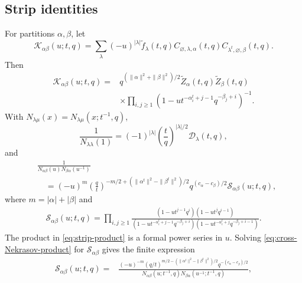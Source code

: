 \documentclass{amsart}
\theoremstyle{definition}
\numberwithin{equation}{section}
\begin{document}
\subsection{Strip identities}
For partitions \(\alpha,\beta\), let
\begin{equation}
 \mathcal K_{\alpha\beta}(u;t,q)
 =\sum_\lambda(-u)^{|\lambda|}\widetilde f_\lambda(t,q)
 C_{\varnothing,\lambda,\alpha}(t,q)
 C_{\lambda^t,\varnothing,\beta}(t,q).
\label{eq:strip-contraction}
\end{equation}
Then
\begin{equation}
\begin{aligned}
 \mathcal K_{\alpha\beta}(u;t,q)
 ={}&q^{(\|\alpha\|^2+\|\beta\|^2)/2}
 \widetilde Z_\alpha(t,q)\widetilde Z_\beta(t,q)\\
 &\times\prod_{i,j\geq1}
 \left(1-u t^{-\alpha_i^t+j-1}q^{-\beta_j+i}\right)^{-1}.
\end{aligned}
\label{eq:strip-product}
\end{equation}
With \(N_{\lambda\mu}(x)=N_{\lambda\mu}(x;t^{-1},q)\),
\begin{equation}
 \frac1{N_{\lambda\lambda}(1)}
 =(-1)^{|\lambda|}\left(\frac tq\right)^{|\lambda|/2}
  \mathscr D_\lambda(t,q),
\label{eq:self-Nekrasov-product}
\end{equation}
and
\begin{equation}
\begin{aligned}
 &\frac1{N_{\alpha\beta}(u)N_{\beta\alpha}(u^{-1})}\\
 &\quad={}
 (-u)^m
 \left(\frac qt\right)^{-m/2+
 (\|\alpha^t\|^2-\|\beta^t\|^2)/2}
 q^{(c_\alpha-c_\beta)/2}
 \mathcal S_{\alpha\beta}(u;t,q),
\end{aligned}
\label{eq:cross-Nekrasov-product}
\end{equation}
where \(m=|\alpha|+|\beta|\) and
\begin{equation}
\begin{aligned}
 \mathcal S_{\alpha\beta}(u;t,q)
 =\prod_{i,j\geq1}
 \frac{(1-u t^{j-1}q^i)(1-u t^jq^{i-1})}
 {(1-u t^{-\alpha_i^t+j-1}q^{-\beta_j+i})
  (1-u t^{-\alpha_i^t+j}q^{-\beta_j+i-1})}.
\end{aligned}
\label{eq:R-alpha-beta}
\end{equation}
The product in \eqref{eq:strip-product} is a formal power series in \(u\).  Solving \eqref{eq:cross-Nekrasov-product} for \(\mathcal S_{\alpha\beta}\) gives the finite expression
\begin{equation}
\begin{aligned}
 \mathcal S_{\alpha\beta}(u;t,q)
 ={}&\frac{(-u)^{-m}
 (q/t)^{m/2-(\|\alpha^t\|^2-\|\beta^t\|^2)/2}
 q^{-(c_\alpha-c_\beta)/2}}
 {N_{\alpha\beta}(u;t^{-1},q)
  N_{\beta\alpha}(u^{-1};t^{-1},q)},
\end{aligned}
\label{eq:R-alpha-beta-finite}
\end{equation}
\end{document}
